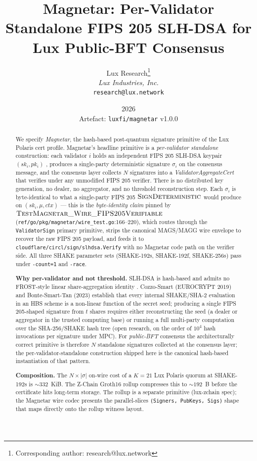 \documentclass[11pt,a4paper]{article}
\title{Magnetar: Per-Validator Standalone FIPS 205 SLH-DSA for Lux Public-BFT Consensus}
\author{
Lux Research\thanks{Corresponding author: research@lux.network}\\
\textit{Lux Industries, Inc.}\\
\texttt{research@lux.network}
}
\date{2026 \\ \normalsize Artefact: \texttt{luxfi/magnetar} v1.0.0}
\begin{document}
\luxcoverpage

\begin{abstract}
We specify \emph{Magnetar}, the hash-based post-quantum signature
primitive of the Lux Polaris cert profile. Magnetar's headline
primitive is a \emph{per-validator standalone} construction: each
validator $i$ holds an independent FIPS 205 SLH-DSA keypair
$(sk_i, pk_i)$ \cite{fips205}, produces a single-party deterministic
signature $\sigma_i$ on the consensus message, and the consensus
layer collects $N$ signatures into a \emph{ValidatorAggregateCert}
that verifies under any unmodified FIPS 205 verifier. There is no
distributed key generation, no dealer, no aggregator, and no
threshold reconstruction step. Each $\sigma_i$ is byte-identical to
what a single-party FIPS 205 $\textsc{SignDeterministic}$ would
produce on $(sk_i, \mu, \mathit{ctx})$ --- this is the
\emph{byte-identity claim} pinned by
$\textsc{TestMagnetar\_Wire\_FIPS205Verifiable}$
(\texttt{ref/go/pkg/magnetar/wire\_test.go}:166--220), which routes
through the \texttt{ValidatorSign} primary primitive, strips the
canonical MAGS/MAGG wire envelope to recover the raw FIPS 205
payload, and feeds it to
\texttt{cloudflare/circl/sign/slhdsa.Verify} \cite{circl} with no
Magnetar code path on the verifier side. All three SHAKE parameter
sets (SHAKE-192s, SHAKE-192f, SHAKE-256s) pass under
\texttt{-count=1} and \texttt{-race}.

\textbf{Why per-validator and not threshold.} SLH-DSA is hash-based
and admits no FROST-style linear share-aggregation identity
\cite{cosmin2021,sphincs,fips205}. Cozzo-Smart (EUROCRYPT 2019) and
Bonte-Smart-Tan (2023) establish that every internal SHAKE/SHA-2
evaluation in an HBS scheme is a non-linear function of the secret
seed; producing a single FIPS 205-shaped signature from $t$ shares
requires either reconstructing the seed (a dealer or aggregator in
the trusted computing base) or running a full multi-party
computation over the SHA-256/SHAKE hash tree (open research, on
the order of $10^4$ hash invocations per signature under MPC). For
\emph{public-BFT} consensus the architecturally correct primitive
is therefore $N$ standalone signatures collected at the consensus
layer; the per-validator-standalone construction shipped here is
the canonical hash-based instantiation of that pattern.

\textbf{Composition.} The $N \times |\sigma|$ on-wire cost of a
$K=21$ Lux Polaris quorum at SHAKE-192s is $\sim 332$~KiB. The
Z-Chain Groth16 rollup compresses this to $\sim 192$~B before the
certificate hits long-term storage. The rollup is a separate
primitive (lux-zchain spec); the Magnetar wire codec presents the
parallel-slices \texttt{(Signers, PubKeys, Sigs)} shape that maps
directly onto the rollup witness layout.


\end{abstract}
\end{document}
